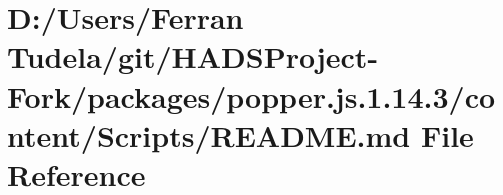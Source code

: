 \hypertarget{packages_2popper_8js_81_814_83_2content_2Scripts_2README_8md}{}\section{D\+:/\+Users/\+Ferran Tudela/git/\+H\+A\+D\+S\+Project-\/\+Fork/packages/popper.js.1.14.3/content/\+Scripts/\+R\+E\+A\+D\+ME.md File Reference}
\label{packages_2popper_8js_81_814_83_2content_2Scripts_2README_8md}
